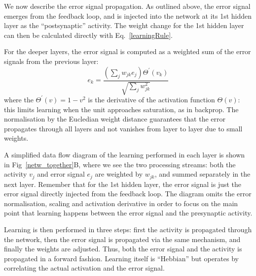 \documentclass{llncs}
\begin{document}
We now describe the error signal propagation. As outlined above, the error
signal emerges from the feedback loop, and is injected into the
network at its 1st hidden layer as the ``postsynaptic'' activity. The weight change for the 1st hidden layer can then be calculated directly with Eq.~\ref{learningRule}.

For the deeper layers, the error signal is computed as a weighted
sum of the error signals from the previous layer:
\begin{equation}
  e_k = \frac{\left( \sum_j w_{jk} e_{j} \right) \Theta^\prime (v_k) }{\sqrt{\sum_j w_{jk}^2}}
\end{equation}
where the $\Theta^\prime (v) = 1 - v^2$ is the derivative of the activation
function $\Theta(v)$: this limits learning when the unit approaches saturation,
as in backprop. The normalisation by the Eucledian weight
distance guarantees that the error propagates through all layers and
not vanishes from layer to layer due to small weights.

A simplified data flow diagram of the learning performed in each layer
is shown in Fig~\ref{netw_together}B, where we see the two processing
streams: both the activity $v_j$ and error signal $e_j$ are
weighted by $w_{jk}$, and summed separately in the next layer.
Remember that for the 1st hidden layer, the error signal is just the
error signal directly injected from the feedback loop. The diagram omits the error
normalisation, scaling and activation derivative in order to focus on the main point that learning happens between the error signal and the
presynaptic activity.

Learning is then performed in three steps: first the activity is
propagated through the network, then the error signal is propagated
via the same mechanism, and finally the weights are adjusted. Thus,
both the error signal and the activity is propagated in a forward
fashion.  Learning itself is ``Hebbian'' but operates by correlating
the actual activation and the error signal.
\end{document}
